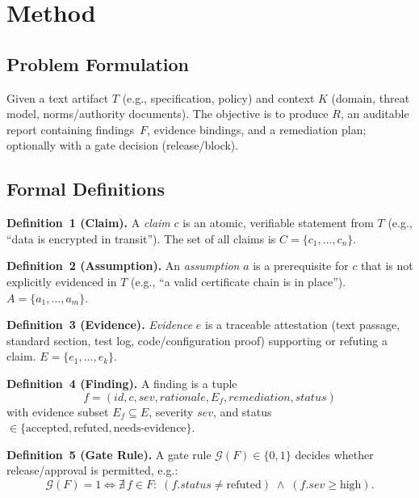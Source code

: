 \documentclass[11pt,a4paper]{article}
\begin{document}
\section{Method}

\subsection{Problem Formulation}
Given a text artifact $T$ (e.g., specification, policy) and context $K$ (domain, threat model, norms/authority documents).
The objective is to produce $R$, an auditable report containing findings~$F$, evidence bindings, and a remediation plan; optionally with a gate decision (release/block).

\subsection{Formal Definitions}

\textbf{Definition~1 (Claim).}
A \emph{claim} $c$ is an atomic, verifiable statement from $T$ (e.g., ``data is encrypted in transit'').
The set of all claims is $C=\{c_1,\dots,c_n\}$.

\textbf{Definition~2 (Assumption).}
An \emph{assumption} $a$ is a prerequisite for $c$ that is not explicitly evidenced in $T$ (e.g., ``a valid certificate chain is in place'').
$A=\{a_1,\dots,a_m\}$.

\textbf{Definition~3 (Evidence).}
\emph{Evidence} $e$ is a traceable attestation (text passage, standard section, test log, code/configuration proof) supporting or refuting a claim.
$E=\{e_1,\dots,e_k\}$.

\textbf{Definition~4 (Finding).}
A finding is a tuple
\[
  f = (\mathit{id}, c, \mathit{sev}, \mathit{rationale}, E_f, \mathit{remediation}, \mathit{status})
\]
with evidence subset $E_f \subseteq E$, severity $\mathit{sev}$, and status $\in \{\text{accepted}, \text{refuted}, \text{needs-evidence}\}$.

\textbf{Definition~5 (Gate Rule).}
A gate rule $\mathcal{G}(F)\in\{0,1\}$ decides whether release/approval is permitted, e.g.:
\[
  \mathcal{G}(F)=1 \iff \nexists\, f\in F:\;(f.\mathit{status}\neq\text{refuted}) \;\land\; (f.\mathit{sev} \ge \text{high}).
\]

\end{document}
